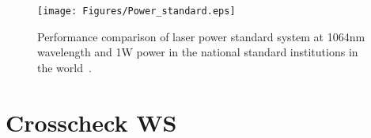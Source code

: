 \begin{figure}
\begin{center}
\texttt{[image: Figures/Power\_standard.eps]}
\caption{
Performance comparison of laser power standard system at 1064nm wavelength and 1W power in the national standard institutions in the world~\cite{EUROMET}.
} 
\label{fig:Power_standard} 
\end{center}
\end{figure}

\section{Crosscheck WS}
